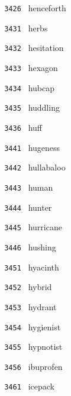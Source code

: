 \documentclass[11pt]{article}
\begin{document}
\begin{multicols}{6}
\noindent \texttt{ 3426 } \hspace{1mm} henceforth  \par
\noindent \texttt{ 3431 } \hspace{1mm} herbs  \par
\noindent \texttt{ 3432 } \hspace{1mm} hesitation  \par
\noindent \texttt{ 3433 } \hspace{1mm} hexagon  \par
\noindent \texttt{ 3434 } \hspace{1mm} hubcap  \par
\noindent \texttt{ 3435 } \hspace{1mm} huddling  \par
\noindent \texttt{ 3436 } \hspace{1mm} huff  \par
\noindent \texttt{ 3441 } \hspace{1mm} hugeness  \par
\noindent \texttt{ 3442 } \hspace{1mm} hullabaloo  \par
\noindent \texttt{ 3443 } \hspace{1mm} human  \par
\noindent \texttt{ 3444 } \hspace{1mm} hunter  \par
\noindent \texttt{ 3445 } \hspace{1mm} hurricane  \par
\noindent \texttt{ 3446 } \hspace{1mm} hushing  \par
\noindent \texttt{ 3451 } \hspace{1mm} hyacinth  \par
\noindent \texttt{ 3452 } \hspace{1mm} hybrid  \par
\noindent \texttt{ 3453 } \hspace{1mm} hydrant  \par
\noindent \texttt{ 3454 } \hspace{1mm} hygienist  \par
\noindent \texttt{ 3455 } \hspace{1mm} hypnotist  \par
\noindent \texttt{ 3456 } \hspace{1mm} ibuprofen  \par
\noindent \texttt{ 3461 } \hspace{1mm} icepack  \par

\end{multicols}
\end{document}
